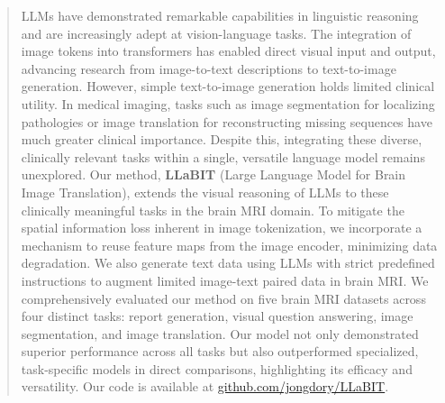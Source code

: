\begin{abstract}
LLMs have demonstrated remarkable capabilities in linguistic reasoning and are increasingly adept at vision-language tasks. The integration of image tokens into transformers has enabled direct visual input and output, advancing research from image-to-text descriptions to text-to-image generation. However, simple text-to-image generation holds limited clinical utility. In medical imaging, tasks such as image segmentation for localizing pathologies or image translation for reconstructing missing sequences have much greater clinical importance. Despite this, integrating these diverse, clinically relevant tasks within a single, versatile language model remains unexplored. Our method, \textbf{LLaBIT} (Large Language Model for Brain Image Translation), extends the visual reasoning of LLMs to these clinically meaningful tasks in the brain MRI domain. To mitigate the spatial information loss inherent in image tokenization, we incorporate a mechanism to reuse feature maps from the image encoder, minimizing data degradation. We also generate text data using LLMs with strict predefined instructions to augment limited image-text paired data in brain MRI. We comprehensively evaluated our method on five brain MRI datasets across four distinct tasks: report generation, visual question answering, image segmentation, and image translation. Our model not only demonstrated superior performance across all tasks but also outperformed specialized, task-specific models in direct comparisons, highlighting its efficacy and versatility. Our code is available at \href{https://github.com/jongdory/LLaBIT}{github.com/jongdory/LLaBIT}.
\end{abstract}

